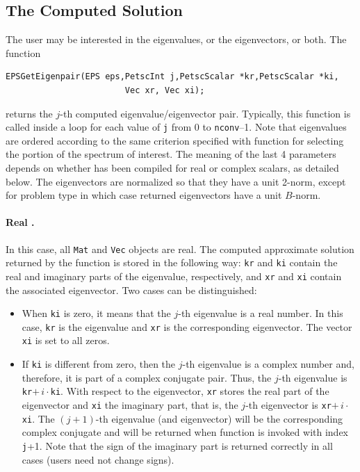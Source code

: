 \subsection{The Computed Solution}

	The user may be interested in the eigenvalues, or the eigenvectors, or both. The function
	\begin{Verbatim}[fontsize=\small]
	EPSGetEigenpair(EPS eps,PetscInt j,PetscScalar *kr,PetscScalar *ki,
                        Vec xr, Vec xi);
	\end{Verbatim}
	\label{GetEigenpair}
returns the $j$-th computed eigenvalue/eigenvector pair. Typically, this function is called inside a loop for each value of \texttt{j} from 0 to \texttt{nconv}--1. Note that eigenvalues are ordered according to the same criterion specified with function  for selecting the portion of the spectrum of interest.
	The meaning of the last 4 parameters depends on whether \slepc has been compiled for real or complex scalars, as detailed below. The eigenvectors are normalized so that they have a unit 2-norm, except for problem type  in which case returned eigenvectors have a unit $B$-norm.

\paragraph{Real \slepc.} In this case, all \texttt{Mat} and \texttt{Vec} objects are real. The computed approximate solution returned by the function  is stored in the following way: \texttt{kr} and \texttt{ki} contain the real and imaginary parts of the eigenvalue, respectively, and \texttt{xr} and \texttt{xi} contain the associated eigenvector. Two cases can be distinguished:

\begin{itemize}
\item	When \texttt{ki} is zero, it means that the $j$-th eigenvalue is a real number. In this case, \texttt{kr} is the eigenvalue and \texttt{xr} is the corresponding eigenvector. The vector \texttt{xi} is set to all zeros.

\item	If \texttt{ki} is different from zero, then the $j$-th eigenvalue is a complex number and, therefore, it is part of a complex conjugate pair. Thus, the $j$-th eigenvalue is \texttt{kr}$+\,i\cdot$\texttt{ki}.
With respect to the eigenvector, \texttt{xr} stores the real part of the eigenvector and \texttt{xi} the imaginary part, that is, the $j$-th eigenvector is \texttt{xr}$+\,i\cdot$\texttt{xi}. The $(j+1)$-th eigenvalue (and eigenvector) will be the corresponding complex conjugate and will be returned when function  is invoked with index \texttt{j}+1. Note that the sign of the imaginary part is returned correctly in all cases (users need not change signs).
\end{itemize}

